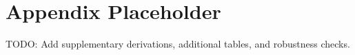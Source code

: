 \section{Appendix Placeholder}
TODO: Add supplementary derivations, additional tables, and robustness checks.
